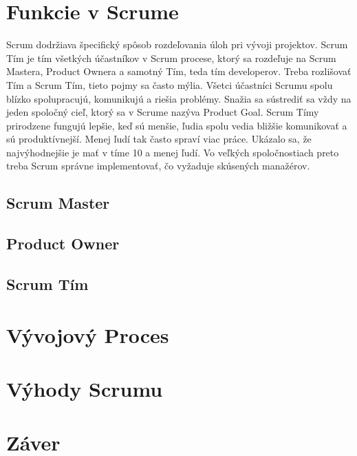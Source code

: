 \documentclass[10pt,slovak,a4paper]{article}
\begin{document}
\cite{agile}

\cite{techScrum}

\section{Funkcie v Scrume} \label{funkcie}

Scrum dodržiava špecifický spôsob rozdeľovania úloh pri vývoji projektov. Scrum Tím je tím všetkých účastníkov v Scrum procese, ktorý sa rozdeľuje na Scrum Mastera, Product Ownera a samotný Tím, teda tím developerov. Treba rozlišovať Tím a Scrum Tím, tieto pojmy sa často mýlia. Všetci účastníci Scrumu spolu blízko spolupracujú, komunikujú a riešia problémy. Snažia sa sústrediť sa vždy na jeden spoločný cieľ, ktorý sa v Scrume nazýva Product Goal. Scrum Tímy prirodzene fungujú lepšie, keď sú menšie, ľudia spolu vedia bližšie komunikovať a sú produktívnejší. Menej ľudí tak často spraví viac práce. Ukázalo sa, že najvýhodnejšie je mať v tíme 10 a menej ľudí. Vo veľkých spoločnostiach preto treba Scrum správne implementovať, čo vyžaduje skúsených manažérov.

\subsection{Scrum Master}

\subsection{Product Owner}

\subsection{Scrum Tím}

\section{Vývojový Proces} \label{proces}

\section{Výhody Scrumu} \label{proces}

\section{Záver} \label{zaver}







\end{document}
